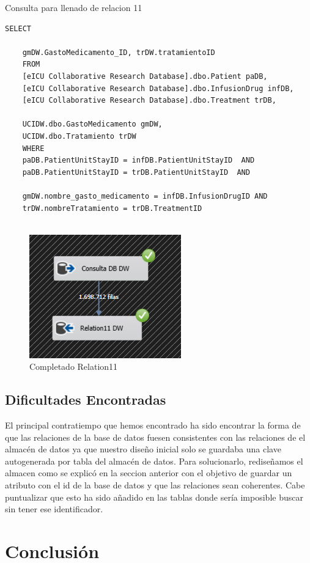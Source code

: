 \documentclass{article}
\begin{document}
	Consulta para llenado de relacion 11
	\begin{lstlisting}[style=ddlstyle, label=lst:relation11,caption=Consulta para llenado de relacion 11]
	SELECT 
	
	gmDW.GastoMedicamento_ID, trDW.tratamientoID 
	FROM 
	[eICU Collaborative Research Database].dbo.Patient paDB,
	[eICU Collaborative Research Database].dbo.InfusionDrug infDB,
	[eICU Collaborative Research Database].dbo.Treatment trDB,
	
	UCIDW.dbo.GastoMedicamento gmDW,
	UCIDW.dbo.Tratamiento trDW
	WHERE 
	paDB.PatientUnitStayID = infDB.PatientUnitStayID  AND 
	paDB.PatientUnitStayID = trDB.PatientUnitStayID  AND
	
	gmDW.nombre_gasto_medicamento = infDB.InfusionDrugID AND
	trDW.nombreTratamiento = trDB.TreatmentID 
	
	\end{lstlisting}

	
	
	\begin{figure}[H]
		\centering
		\includegraphics[width=.3\linewidth]{./images/completados/relation11.png}
		\caption{Completado Relation11}
	\end{figure}
		

	\subsection{Dificultades Encontradas}
	\label{sec:dificultades_encontradas}
	
	El principal contratiempo que hemos encontrado ha sido encontrar la forma de que las relaciones de la base de datos fuesen consistentes con las relaciones de el almacén de datos ya que nuestro diseño inicial solo se guardaba una clave autogenerada por tabla del almacén de datos. Para solucionarlo, rediseñamos el almacen como se explicó en la seccion anterior con el objetivo de guardar un atributo con el id de la base de datos y que las relaciones sean coherentes. Cabe puntualizar que esto ha sido añadido en las tablas donde sería imposible buscar sin tener ese identificador.
	
	\section{Conclusión}
	\label{sec:conclusion}
	
\end{document}
